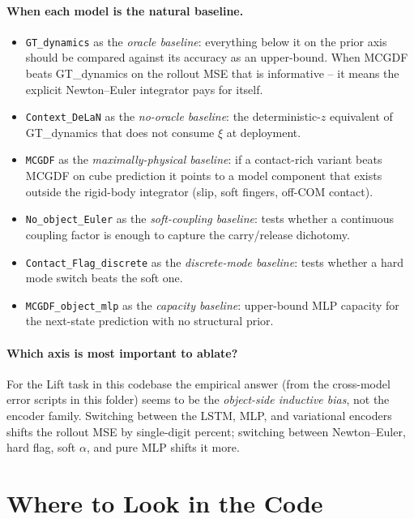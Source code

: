 \documentclass[11pt]{article}
\begin{document}
\paragraph{When each model is the natural baseline.}
\begin{itemize}
  \item \texttt{GT\_dynamics} as the \emph{oracle baseline}:
    everything below it on the prior axis should be compared against
    its accuracy as an upper-bound.  When MCGDF beats GT\_dynamics on
    the rollout MSE that is informative -- it means the explicit
    Newton--Euler integrator pays for itself.
  \item \texttt{Context\_DeLaN} as the \emph{no-oracle baseline}:
    the deterministic-$z$ equivalent of GT\_dynamics that does not
    consume $\xi$ at deployment.
  \item \texttt{MCGDF} as the \emph{maximally-physical baseline}: if
    a contact-rich variant beats MCGDF on cube prediction it points
    to a model component that exists outside the rigid-body
    integrator (slip, soft fingers, off-COM contact).
  \item \texttt{No\_object\_Euler} as the \emph{soft-coupling
    baseline}: tests whether a continuous coupling factor is enough
    to capture the carry/release dichotomy.
  \item \texttt{Contact\_Flag\_discrete} as the \emph{discrete-mode
    baseline}: tests whether a hard mode switch beats the soft one.
  \item \texttt{MCGDF\_object\_mlp} as the \emph{capacity baseline}:
    upper-bound MLP capacity for the next-state prediction with no
    structural prior.
\end{itemize}

\paragraph{Which axis is most important to ablate?}
For the Lift task in this codebase the empirical answer (from the
cross-model error scripts in this folder) seems to be the
\emph{object-side inductive bias}, not the encoder family.  Switching
between the LSTM, MLP, and variational encoders shifts the rollout
MSE by single-digit percent; switching between Newton--Euler, hard
flag, soft $\alpha$, and pure MLP shifts it more.

\section{Where to Look in the Code}
\end{document}
